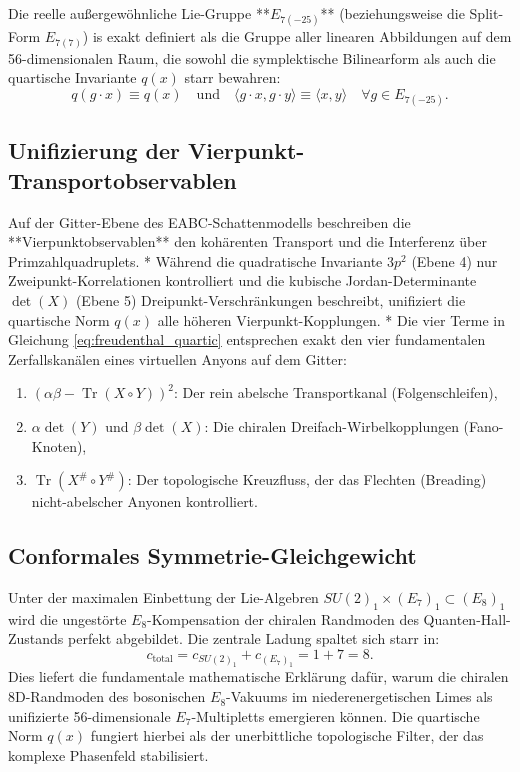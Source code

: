 \documentclass[11pt,a4paper]{article}
\theoremstyle{definition}
\begin{document}
	Die reelle außergewöhnliche Lie-Gruppe **$E_{7(-25)}$** (beziehungsweise die Split-Form $E_{7(7)}$) is exakt definiert als die Gruppe aller linearen Abbildungen auf dem 56-dimensionalen Raum, die sowohl die symplektische Bilinearform als auch die quartische Invariante $q(x)$ starr bewahren:
	\begin{equation}
		q(g \cdot x) \equiv q(x) \quad \text{und} \quad \langle g \cdot x, g \cdot y \rangle \equiv \langle x, y \rangle \quad \forall g \in E_{7(-25)}.
	\end{equation}
	
	\subsection{Unifizierung der Vierpunkt-Transportobservablen}
	Auf der Gitter-Ebene des EABC-Schattenmodells beschreiben die **Vierpunktobservablen** den kohärenten Transport und die Interferenz über Primzahlquadruplets. 
	* Während die quadratische Invariante $3p^2$ (Ebene 4) nur Zweipunkt-Korrelationen kontrolliert und die kubische Jordan-Determinante $\det(X)$ (Ebene 5) Dreipunkt-Verschränkungen beschreibt, unifiziert die quartische Norm $q(x)$ alle höheren Vierpunkt-Kopplungen.
	* Die vier Terme in Gleichung \eqref{eq:freudenthal_quartic} entsprechen exakt den vier fundamentalen Zerfallskanälen eines virtuellen Anyons auf dem Gitter:
	\begin{enumerate}
		\item $(\alpha\beta - \operatorname{Tr}(X \circ Y))^2$: Der rein abelsche Transportkanal (Folgenschleifen),
		\item $\alpha\det(Y)$ und $\beta\det(X)$: Die chiralen Dreifach-Wirbelkopplungen (Fano-Knoten),
		\item $\operatorname{Tr}(X^\# \circ Y^\#)$: Der topologische Kreuzfluss, der das Flechten (Breading) nicht-abelscher Anyonen kontrolliert.
	\end{enumerate}
	
	\subsection{Conformales Symmetrie-Gleichgewicht}
	Unter der maximalen Einbettung der Lie-Algebren $SU(2)_1 \times (E_7)_1 \subset (E_8)_1$ wird die ungestörte $E_8$-Kompensation der chiralen Randmoden des Quanten-Hall-Zustands perfekt abgebildet. Die zentrale Ladung spaltet sich starr in:
	\begin{equation}
		c_{\text{total}} = c_{SU(2)_1} + c_{(E_7)_1} = 1 + 7 = 8.
	\end{equation}
	Dies liefert die fundamentale mathematische Erklärung dafür, warum die chiralen 8D-Randmoden des bosonischen $E_8$-Vakuums im niederenergetischen Limes als unifizierte 56-dimensionale $E_7$-Multipletts emergieren können. Die quartische Norm $q(x)$ fungiert hierbei als der unerbittliche topologische Filter, der das komplexe Phasenfeld stabilisiert.
	
\end{document}
